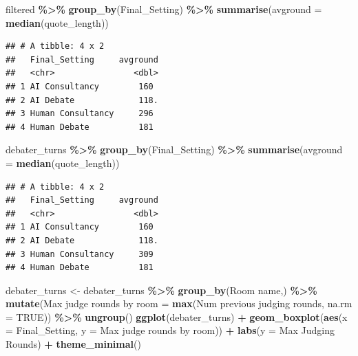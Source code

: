\documentclass[
]{article}
\newenvironment{Shaded}{\begin{snugshade}}{\end{snugshade}}
\newcommand{\AttributeTok}[1]{\textcolor[rgb]{0.13,0.29,0.53}{#1}}
\newcommand{\ConstantTok}[1]{\textcolor[rgb]{0.56,0.35,0.01}{#1}}
\newcommand{\FunctionTok}[1]{\textcolor[rgb]{0.13,0.29,0.53}{\textbf{#1}}}
\newcommand{\NormalTok}[1]{#1}
\newcommand{\OtherTok}[1]{\textcolor[rgb]{0.56,0.35,0.01}{#1}}
\newcommand{\SpecialCharTok}[1]{\textcolor[rgb]{0.81,0.36,0.00}{\textbf{#1}}}
\newcommand{\StringTok}[1]{\textcolor[rgb]{0.31,0.60,0.02}{#1}}
\begin{document}
\begin{Shaded}
\begin{Highlighting}[]
\NormalTok{filtered }\SpecialCharTok{\%\textgreater{}\%} \FunctionTok{group\_by}\NormalTok{(Final\_Setting) }\SpecialCharTok{\%\textgreater{}\%} \FunctionTok{summarise}\NormalTok{(}\AttributeTok{avground =} \FunctionTok{median}\NormalTok{(quote\_length))}
\end{Highlighting}
\end{Shaded}

\begin{verbatim}
## # A tibble: 4 x 2
##   Final_Setting     avground
##   <chr>                <dbl>
## 1 AI Consultancy        160 
## 2 AI Debate             118.
## 3 Human Consultancy     296 
## 4 Human Debate          181
\end{verbatim}

\begin{Shaded}
\begin{Highlighting}[]
\NormalTok{debater\_turns }\SpecialCharTok{\%\textgreater{}\%} \FunctionTok{group\_by}\NormalTok{(Final\_Setting) }\SpecialCharTok{\%\textgreater{}\%} \FunctionTok{summarise}\NormalTok{(}\AttributeTok{avground =} \FunctionTok{median}\NormalTok{(quote\_length))}
\end{Highlighting}
\end{Shaded}

\begin{verbatim}
## # A tibble: 4 x 2
##   Final_Setting     avground
##   <chr>                <dbl>
## 1 AI Consultancy        160 
## 2 AI Debate             118.
## 3 Human Consultancy     309 
## 4 Human Debate          181
\end{verbatim}

\begin{Shaded}
\begin{Highlighting}[]
\NormalTok{debater\_turns }\OtherTok{\textless{}{-}}\NormalTok{ debater\_turns }\SpecialCharTok{\%\textgreater{}\%}
  \FunctionTok{group\_by}\NormalTok{(}\StringTok{\textasciigrave{}}\AttributeTok{Room name}\StringTok{\textasciigrave{}}\NormalTok{,) }\SpecialCharTok{\%\textgreater{}\%}
  \FunctionTok{mutate}\NormalTok{(}\StringTok{\textasciigrave{}}\AttributeTok{Max judge rounds by room}\StringTok{\textasciigrave{}} \OtherTok{=} \FunctionTok{max}\NormalTok{(}\StringTok{\textasciigrave{}}\AttributeTok{Num previous judging rounds}\StringTok{\textasciigrave{}}\NormalTok{, }\AttributeTok{na.rm =} \ConstantTok{TRUE}\NormalTok{)) }\SpecialCharTok{\%\textgreater{}\%}
  \FunctionTok{ungroup}\NormalTok{()}
\FunctionTok{ggplot}\NormalTok{(debater\_turns) }\SpecialCharTok{+}
  \FunctionTok{geom\_boxplot}\NormalTok{(}\FunctionTok{aes}\NormalTok{(}\AttributeTok{x =}\NormalTok{ Final\_Setting, }\AttributeTok{y =} \StringTok{\textasciigrave{}}\AttributeTok{Max judge rounds by room}\StringTok{\textasciigrave{}}\NormalTok{)) }\SpecialCharTok{+}
  \FunctionTok{labs}\NormalTok{(}\AttributeTok{y =} \StringTok{\textquotesingle{}Max Judging Rounds\textquotesingle{}}\NormalTok{) }\SpecialCharTok{+}
  \FunctionTok{theme\_minimal}\NormalTok{() }
\end{Highlighting}
\end{Shaded}
\end{document}
